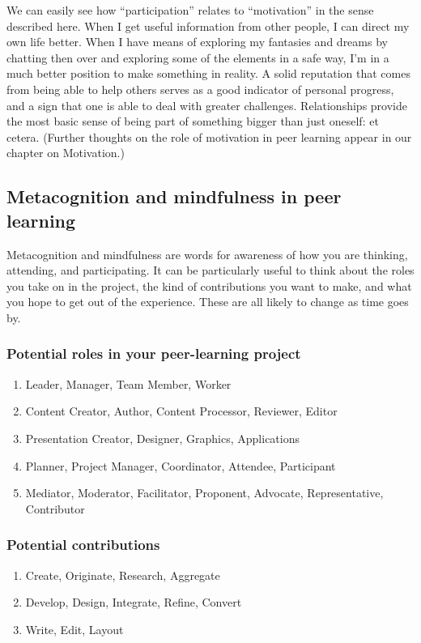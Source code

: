 We can easily see how ``participation'' relates to ``motivation'' in the
sense described here. When I get useful information from other people, I
can direct my own life better. When I have means of exploring my
fantasies and dreams by chatting then over and exploring some of the
elements in a safe way, I'm in a much better position to make something
in reality. A solid reputation that comes from being able to help others
serves as a good indicator of personal progress, and a sign that one is
able to deal with greater challenges. Relationships provide the most
basic sense of being part of something bigger than just oneself: et
cetera. (Further thoughts on the role of motivation in peer learning
appear in our chapter on Motivation.)

\subsection{Metacognition and mindfulness in peer learning}

Metacognition and mindfulness are words for awareness of how you are
thinking, attending, and participating. It can be particularly useful to
think about the roles you take on in the project, the kind of
contributions you want to make, and what you hope to get out of the
experience. These are all likely to change as time goes by.

\subsubsection{Potential roles in your peer-learning project}

\begin{enumerate}
\item
  Leader, Manager, Team Member, Worker
\item
  Content Creator, Author, Content Processor, Reviewer, Editor
\item
  Presentation Creator, Designer, Graphics, Applications
\item
  Planner, Project Manager, Coordinator, Attendee, Participant
\item
  Mediator, Moderator, Facilitator, Proponent, Advocate, Representative,
  Contributor
\end{enumerate}
\subsubsection{Potential contributions}

\begin{enumerate}
\item
  Create, Originate, Research, Aggregate
\item
  Develop, Design, Integrate, Refine, Convert
\item
  Write, Edit, Layout
\end{enumerate}
